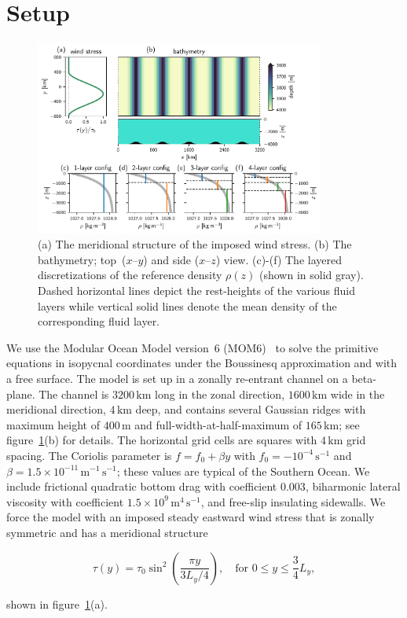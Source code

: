 \documentclass{agujournal2019}
\begin{document}
\section{Setup}

\begin{figure}[t]
\centering
\noindent\includegraphics[width=0.85\textwidth]{domaindensities}
\vspace*{-1em}\caption{(a) The meridional structure of the imposed wind stress. (b) The bathymetry; top~($x$--$y$) and side ($x$--$z$) view. (c)-(f) The layered discretizations of the reference density $\rho(z)$ (shown in solid gray). Dashed horizontal lines depict the rest-heights of the various fluid layers while vertical solid lines denote the mean density of the corresponding fluid layer.}\label{fig:domain}\vspace*{-4em}
\end{figure}


We use the Modular Ocean Model version~6 (MOM6)~\cite{Adcroft-etal-2019-mom6} to solve the primitive equations in isopycnal coordinates under the Boussinesq approximation and with a free surface. The model is set up in a zonally re-entrant channel on a beta-plane. The channel is $3200\,\mathrm{km}$ long in the zonal direction, $1600\,\mathrm{km}$ wide in the meridional direction, $4\,\mathrm{km}$ deep, and contains several Gaussian ridges with maximum height of $400\,\mathrm{m}$ and full-width-at-half-maximum of $165\,\mathrm{km}$; see figure~\ref{fig:domain}(b) for details. The horizontal grid cells are squares with $4\,\mathrm{km}$ grid spacing. The Coriolis parameter is $f=f_0+\beta y$ with $f_0=-10^{-4}\,\mathrm{s}^{-1}$ and $\beta=1.5\times 10^{-11}\,\mathrm{m}^{-1}\,\mathrm{s}^{-1}$; these values are typical of the Southern Ocean. We include frictional quadratic bottom drag {\color{black}with coefficient 0.003}, biharmonic lateral viscosity {\color{black}with coefficient $1.5\times10^9\,\mathrm{m}^4\,\mathrm{s}^{-1}$}, and free-slip {\color{black}insulating} sidewalls. We force the model with an imposed steady eastward wind stress that is zonally symmetric and has a meridional structure 
\begin{linenomath*}
\begin{equation}
    \tau(y) = \tau_0 \sin^2 \left(\frac{\pi y}{3L_y/4}\right),\quad\text{for } 0\le y\le \frac{3}{4}L_y, \label{eq:windstress}
\end{equation} 
\end{linenomath*}
shown in figure~\ref{fig:domain}(a). 
\end{document}
